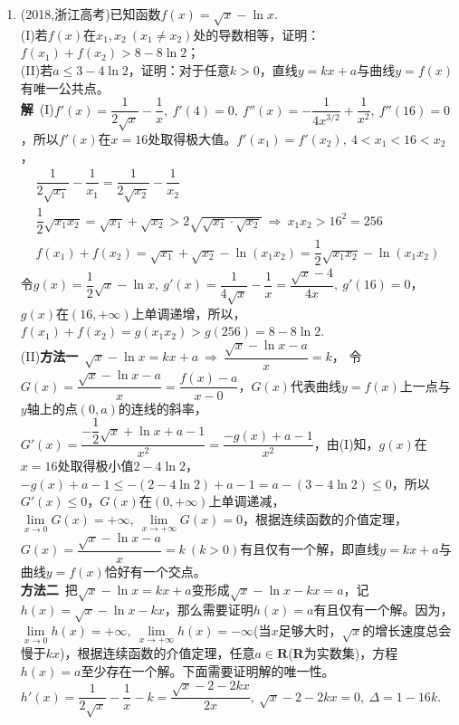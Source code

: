 \begin{enumerate}[label={【\textbf{例\thechapter.\arabic*}】},
 leftmargin=\inteval{\myenumleftmargin}pt,
 itemsep=\inteval{\myenumitempsep}pt,
 itemindent=\inteval{\myenumitemindent}pt]
\item (2018,浙江高考)已知函数$ f(x)=\sqrt{x}-\ln x $.\\
(I)若$ f(x) $在$ x_1,x_2\ (x_1\neq x_2) $处的导数相等，证明：$ f(x_1)+f(x_2)>8-8\ln 2 $； \\
(II)若$ a\leq 3-4\ln 2 $，证明：对于任意$ k>0 $，直线$ y=kx+a $与曲线$ y=f(x) $有唯一公共点。 \\
\textbf{解}\ (I)$ f'(x)=\dfrac{1}{2\sqrt{x}}-\dfrac{1}{x},\ f'(4)=0,\  f''(x)=-\dfrac{1}{4x^{3/2}}+\dfrac{1}{x^2},\ f''(16)=0 $，所以$ f'(x) $在$ x=16 $处取得极大值。$ f'(x_1)=f'(x_2),\ 4<x_1<16<x_2 $，
\begin{gather*}
    \dfrac{1}{2\sqrt{x_1}}-\dfrac{1}{x_1}=\dfrac{1}{2\sqrt{x_2}}-\dfrac{1}{x_2} \\ 
    \dfrac{1}{2}\sqrt{x_1x_2}=\sqrt{x_1}+\sqrt{x_2}>
    2\sqrt{\sqrt{x_1}\cdot \sqrt{x_2}}\ 
    \Rightarrow \ 	x_1x_2>16^2=256 \\
    f(x_1)+f(x_2)=\sqrt{x_1}+\sqrt{x_2}-\ln(x_1x_2)
    =\dfrac{1}{2}\sqrt{x_1x_2}-\ln(x_1x_2)
\end{gather*}
令$ g(x)=\dfrac{1}{2}\sqrt{x}-\ln x,\ g'(x)=\dfrac{1}{4\sqrt{x}}-\dfrac{1}{x}=\dfrac{\sqrt{x}-4}{4x},\ g'(16)=0 $，$ g(x) $在$ (16,+\infty) $上单调递增，所以，$ f(x_1)+f(x_2)=g(x_1x_2)>g(256)=8-8\ln 2 $. \medskip \\
(II)\textbf{方法一}\  
$ \sqrt{x}-\ln x=kx+a\ \Rightarrow \ \dfrac{\sqrt{x}-\ln x-a}{x}=k $，
令$ G(x)=\dfrac{\sqrt{x}-\ln x-a}{x}=\dfrac{f(x)-a}{x-0} $，$ G(x) $代表曲线$ y=f(x) $上一点与$ y $轴上的点$ (0,a) $的连线的斜率，$ G'(x)=\dfrac{-\dfrac{1}{2}\sqrt{x}+\ln x+a-1}{x^2}=\dfrac{-g(x)+a-1}{x^2} $，由(I)知，$ g(x) $在$ x=16 $处取得极小值$ 2-4\ln 2 $，$ -g(x)+a-1\leq -(2-4\ln2)+a-1=a-(3-4\ln 2)\leq 0 $，所以$ G'(x)\leq 0 $，$ G(x) $在$ (0,+\infty) $上单调递减，$ \lim\limits_{x\to 0}G(x)=+\infty,\ \lim\limits_{x\to +\infty}G(x)=0 $，根据连续函数的介值定理，$ G(x)=\dfrac{\sqrt{x}-\ln x-a}{x}=k\ (k>0) $有且仅有一个解，即直线$ y=kx+a $与曲线$ y=f(x) $恰好有一个交点。\\
\textbf{方法二}\ 把$ \sqrt{x}-\ln x=kx+a $变形成$ \sqrt{x}-\ln x-kx=a $，记$ h(x)=\sqrt{x}-\ln x-kx $，那么需要证明$ h(x)=a $有且仅有一个解。因为，$ \lim\limits_{x\to 0}h(x)=+\infty,\ \lim\limits_{x\to +\infty}h(x)=-\infty $(当$ x $足够大时，$ \sqrt{x} $的增长速度总会慢于$ kx $)，根据连续函数的介值定理，任意$ a\in \textbf{R} $(\textbf{R}为实数集)，方程$ h(x)=a $至少存在一个解。下面需要证明解的唯一性。$ h'(x)=\dfrac{1}{2\sqrt{x}}-\dfrac{1}{x}-k=\dfrac{\sqrt{x}-2-2kx}{2x},\ \sqrt{x}-2-2kx=0,\ \Delta=1-16k $. \\

\end{enumerate}
